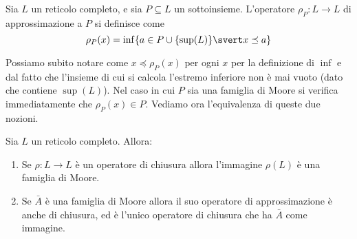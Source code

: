\documentclass[12pt]{article}
\numberwithin{theorem}{subsection}
\begin{document}
\begin{definition}
	Sia $L$ un reticolo completo, e sia $P \subseteq L$ un sottoinsieme. L'operatore $\rho_P : L \rightarrow L$ di approssimazione a $P$ si definisce come
	\[
	\rho_P(x) = \inf \{ a \in P \cup \{ \sup(L) \} \svert x \preceq a \}
	\]
\end{definition}

Possiamo subito notare come $x \preceq \rho_P(x)$ per ogni $x$ per la definizione di $\inf$ e dal fatto che l'insieme di cui si calcola l'estremo inferiore non è mai vuoto (dato che contiene $\sup(L)$). Nel caso in cui $P$ sia una famiglia di Moore si verifica immediatamente che $\rho_P(x) \in P$. Vediamo ora l'equivalenza di queste due nozioni.

\begin{prop}
	Sia $L$ un reticolo completo. Allora:\begin{enumerate}
		\item Se $\rho: L \rightarrow L$ è un operatore di chiusura allora l'immagine $\rho(L)$ è una famiglia di Moore.
		\item Se $\bar{A}$ è una famiglia di Moore allora il suo operatore di approssimazione è anche di chiusura, ed è l'unico operatore di chiusura che ha $\bar{A}$ come immagine.
	\end{enumerate}
\end{prop}
\end{document}
